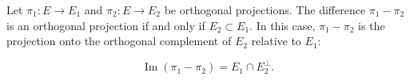 Let $\pi_1: E \rightarrow E_1$ and $\pi_2: E \rightarrow E_2$ be orthogonal projections. The difference $\pi_1 - \pi_2$ is an orthogonal projection if and only if $E_2 \subset E_1$. In this case, $\pi_1 - \pi_2$ is the projection onto the orthogonal complement of $E_2$ relative to $E_1$:

$$\operatorname{Im}(\pi_1 - \pi_2) = E_1 \cap E_2^\perp.$$
